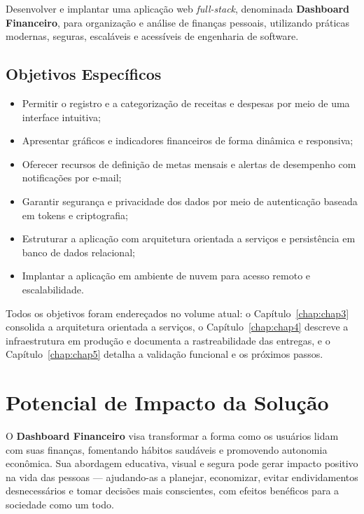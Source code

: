 Desenvolver e implantar uma aplicação web \textit{full\hyp stack}, denominada \textbf{Dashboard Financeiro}, para organização e análise de finanças pessoais, utilizando práticas modernas, seguras, escaláveis e acessíveis de engenharia de software.

\subsection{Objetivos Específicos}

\begin{itemize}
    \item Permitir o registro e a categorização de receitas e despesas por meio de uma interface intuitiva;
    \item Apresentar gráficos e indicadores financeiros de forma dinâmica e responsiva;
    \item Oferecer recursos de definição de metas mensais e alertas de desempenho com notificações por e\hyp mail;
    \item Garantir segurança e privacidade dos dados por meio de autenticação baseada em tokens e criptografia;
    \item Estruturar a aplicação com arquitetura orientada a serviços e persistência em banco de dados relacional;
    \item Implantar a aplicação em ambiente de nuvem para acesso remoto e escalabilidade.
\end{itemize}

Todos os objetivos foram endereçados no volume atual: o Capítulo~\ref{chap:chap3} consolida a arquitetura orientada a serviços, o Capítulo~\ref{chap:chap4} descreve a infraestrutura em produção e documenta a rastreabilidade das entregas, e o Capítulo~\ref{chap:chap5} detalha a validação funcional e os próximos passos.

\section{Potencial de Impacto da Solução}

O \textbf{Dashboard Financeiro} visa transformar a forma como os usuários lidam com suas finanças, fomentando hábitos saudáveis e promovendo autonomia econômica. Sua abordagem educativa, visual e segura pode gerar impacto positivo na vida das pessoas — ajudando-as a planejar, economizar, evitar endividamentos desnecessários e tomar decisões mais conscientes, com efeitos benéficos para a sociedade como um todo.
